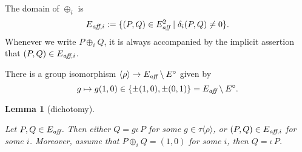 \documentclass[12pt]{article}
\newtheorem{lemma}[theorem]{Lemma}
\newcommand{\ring}[1]{\mathbb{#1}}
\newcommand{\op}[1]{\hbox{#1}}
\newcommand{\f}[1]{\frac{1}{#1}}
\newcommand{\Eaff}{E_{\op{\scriptsize\it aff}}}
\newcommand{\Eaf}[1]{E_{\op{\scriptsize\it aff},{#1}}}
\newcommand{\Eoo}{E^{\circ}} %
\newcommand{\ang}[1]{\langle{#1}\rangle}
\begin{document}







The domain of $\oplus_i$ is
\[
\Eaf{i} := \{(P,Q)\in \Eaff^2\mid \delta_i(P,Q)\ne0\}.
\]
Whenever we write $P\oplus_i Q$, it is always accompanied by
the implicit assertion that 
$(P,Q)\in \Eaf{i}$.

There is a group isomorphism $\ang{\rho}\to \Eaff\setminus\Eoo$ given by
\[
g\mapsto g(1,0)\in\{\pm (1,0),\pm (0,1)\} = \Eaff\setminus \Eoo.
\]




\begin{lemma}[dichotomy]\label{lemma:noco} 
\par
\noindent  
Let $P,Q\in \Eaff$.  Then either $Q=g \iota\, P$ for some $g\in
  \tau\ang{\rho}$, or $(P,Q)\in \Eaf{i}$ for some $i$.
Moreover, assume that $P\oplus_i Q = (1,0)$ for some $i$,
then $Q = \iota\,P$.
\end{lemma}
\end{document}
